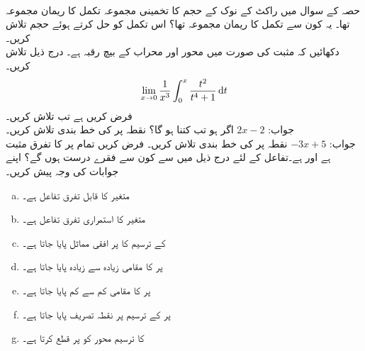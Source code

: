 \\
حصہ  کے سوال  میں راکٹ کے نوک کے حجم کا تخمینی مجموعہ  تکمل کا ریمان مجموعہ تھا۔ یہ کون سے تکمل کا ریمان مجموعہ تھا؟ اس تکمل کو حل کرتے ہوئے حجم تلاش کریں۔  
\\
دکھائیں کہ مثبت  کی صورت میں  محور اور محراب  کے بیچ رقبہ  ہے۔
درج ذیل تلاش کریں۔
\begin{align*}
\lim_{x\to 0} \frac{1}{x^3}\int_0^x\frac{t^2}{t^4+1}\dif t
\end{align*}
فرض کریں  ہے تب  تلاش کریں۔\\
جواب:\quad
$2x-2$
اگر  ہو تب  کتنا ہو گا؟
نقطہ  پر  کی خط بندی تلاش کریں۔\\
جواب:\quad
$-3x+5$
نقطہ  پر  کی خط بندی تلاش کریں۔
فرض کریں تمام  پر  کا تفرق مثبت ہے اور  ہے۔تفاعل  کے لئے درج ذیل میں سے کون سے فقرے درست ہوں گے؟ اپنے جوابات کی وجہ پیش کریں۔
\begin{enumerate}[a.]
\item
{} متغیر  کا قابل تفرق تفاعل ہے۔
\item
{} متغیر  کا استمراری تفرق تفاعل ہے۔
\item
{} کے ترسیم کا  پر افقی مماثل پایا جاتا ہے۔
\item
{} پر  کا مقامی زیادہ سے زیادہ پایا جاتا ہے۔
\item
{} پر  کا مقامی کم سے کم پایا جاتا ہے۔
\item
{} پر  کے ترسیم پر نقطہ تصریف پایا جاتا ہے۔
\item
{} کا ترسیم  محور کو  پر قطع کرتا ہے۔
\end{enumerate}
